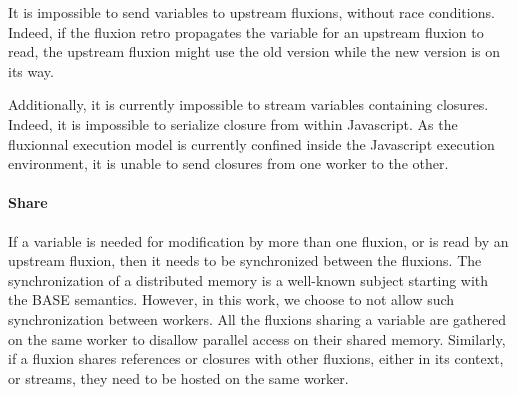 It is impossible to send variables to upstream flux\-ions, without race conditions.
Indeed, if the fluxion retro propagates the variable for an upstream fluxion to read, the upstream fluxion might use the old version while the new version is on its way.

Additionally, it is currently impossible to stream variables containing closures.
Indeed, it is impossible to serialize closure from within Javascript.
As the fluxionnal execution model is currently confined inside the Javascript execution environment, it is unable to send closures from one worker to the other.

\paragraph{Share}
If a variable is needed for modification by more than one fluxion, or is read by an upstream fluxion, then it needs to be synchronized between the fluxions.
The synchronization of a distributed memory is a well-known subject starting with %
the BASE semantics\cite{Fox1997}.
However, in this work, we choose to not allow such synchronization between workers.
All the fluxions sharing a variable are gathered on the same worker to disallow parallel access on their shared memory.
Similarly, if a fluxion shares references or closures with other fluxions, either in its context, or streams, they need to be hosted on the same worker.


















\endinput

























\subsection{Compilation example} \label{section:example}

